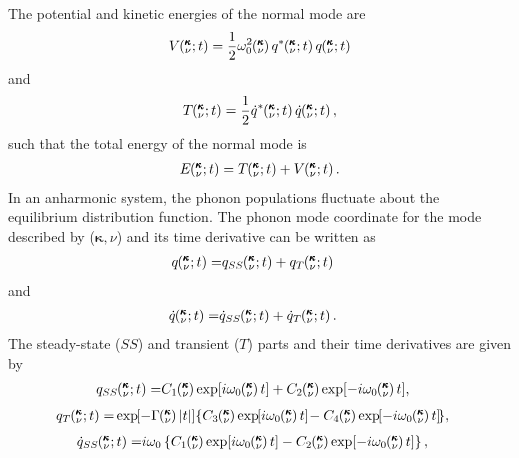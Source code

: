 The potential and kinetic energies of the normal mode are
\begin{equation}\label{A:E:q_U}
\begin{split}
V\kvt = \frac{1}{2} \omega_0^2\kv q^*\kvt q\kvt
\end{split}
\end{equation}
and
\begin{equation}\label{A:E:q_T}
\begin{split}
T\kvt = \frac{1}{2} \dot{q}^*\kvt \dot{q}\kvt, 
\end{split}
\end{equation}
such that the total energy of the normal mode is
\begin{equation}\label{A:E:q_E}
\begin{split}
E\kvt = T\kvt + V\kvt.
\end{split}
\end{equation}
In an anharmonic system, the phonon populations fluctuate about the
equilibrium distribution function.\cite{wallace_thermodynamics_1972,
maradudin_dynamical_1974,srivastava_physics_1990} 
The phonon mode 
coordinate for the mode described by ($\pmb{\kappa},\nu$) and its time
derivative can be written as
\begin{equation}\label{A:E:q_A}
\begin{split}
q\kvt=&q_{SS}\kvt+q_{T}\kvt
\end{split}
\end{equation}
and
\begin{equation}\label{A:E:qdot_A}
\begin{split}
\dot{q}\kvt=& \dot{q}_{SS}\kvt+\dot{q}_{T}\kvt.
\end{split}
\end{equation}
The steady-state ($SS$) and transient ($T$) parts and their time 
derivatives are given by
\begin{equation}\label{A:E:q_A_SS}
\begin{split}
q_{SS}\kvt=& C_1\kv\exp[i\omega_0\kv t] + 
C_2\kv\exp[-i\omega_0\kv t],
\end{split}
\end{equation}
\begin{equation}\label{A:E:q_A_T}
\begin{split}
q_{T}\kvt=& \EXP{-\Gamma\kv |t|}\lbrace C_3\kv\EXP{i\omega_0\kv t} - 
C_4\kv\EXP{-i\omega_0\kv t } \rbrace,
\end{split}
\end{equation}
\begin{equation}\label{A:E:qdot_A_SS}
\begin{split}
\dot{q}_{SS}\kvt=& i\omega_0\left\{C_1\kv\exp[i\omega_0\kv t]-C_2\kv
\exp[-i\omega_0\kv t]\right\} ,
\end{split}
\end{equation}
